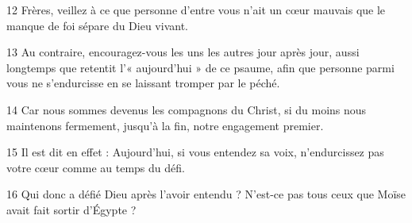 
12 Frères, veillez à ce que personne d’entre vous n’ait un cœur mauvais que le manque de foi sépare du Dieu vivant.

13 Au contraire, encouragez-vous les uns les autres jour après jour, aussi longtemps que retentit l’« aujourd’hui » de ce psaume, afin que personne parmi vous ne s’endurcisse en se laissant tromper par le péché.

14 Car nous sommes devenus les compagnons du Christ, si du moins nous maintenons fermement, jusqu’à la fin, notre engagement premier.

15 Il est dit en effet : Aujourd’hui, si vous entendez sa voix, n’endurcissez pas votre cœur comme au temps du défi.

16 Qui donc a défié Dieu après l’avoir entendu ? N’est-ce pas tous ceux que Moïse avait fait sortir d’Égypte ?